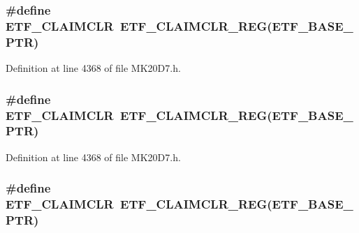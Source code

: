 \subsubsection[{\texorpdfstring{E\+T\+F\+\_\+\+C\+L\+A\+I\+M\+C\+LR}{ETF_CLAIMCLR}}]{\setlength{\rightskip}{0pt plus 5cm}\#define E\+T\+F\+\_\+\+C\+L\+A\+I\+M\+C\+LR~{\bf E\+T\+F\+\_\+\+C\+L\+A\+I\+M\+C\+L\+R\+\_\+\+R\+EG}({\bf E\+T\+F\+\_\+\+B\+A\+S\+E\+\_\+\+P\+TR})}\hypertarget{group___e_t_f___register___accessor___macros_gaa6878376b1743caa780380b1fd3fd26b}{}\label{group___e_t_f___register___accessor___macros_gaa6878376b1743caa780380b1fd3fd26b}


Definition at line 4368 of file M\+K20\+D7.\+h.

\subsubsection[{\texorpdfstring{E\+T\+F\+\_\+\+C\+L\+A\+I\+M\+C\+LR}{ETF_CLAIMCLR}}]{\setlength{\rightskip}{0pt plus 5cm}\#define E\+T\+F\+\_\+\+C\+L\+A\+I\+M\+C\+LR~{\bf E\+T\+F\+\_\+\+C\+L\+A\+I\+M\+C\+L\+R\+\_\+\+R\+EG}({\bf E\+T\+F\+\_\+\+B\+A\+S\+E\+\_\+\+P\+TR})}\hypertarget{group___e_t_f___register___accessor___macros_gaa6878376b1743caa780380b1fd3fd26b}{}\label{group___e_t_f___register___accessor___macros_gaa6878376b1743caa780380b1fd3fd26b}


Definition at line 4368 of file M\+K20\+D7.\+h.

\subsubsection[{\texorpdfstring{E\+T\+F\+\_\+\+C\+L\+A\+I\+M\+C\+LR}{ETF_CLAIMCLR}}]{\setlength{\rightskip}{0pt plus 5cm}\#define E\+T\+F\+\_\+\+C\+L\+A\+I\+M\+C\+LR~{\bf E\+T\+F\+\_\+\+C\+L\+A\+I\+M\+C\+L\+R\+\_\+\+R\+EG}({\bf E\+T\+F\+\_\+\+B\+A\+S\+E\+\_\+\+P\+TR})}\hypertarget{group___e_t_f___register___accessor___macros_gaa6878376b1743caa780380b1fd3fd26b}{}\label{group___e_t_f___register___accessor___macros_gaa6878376b1743caa780380b1fd3fd26b}


